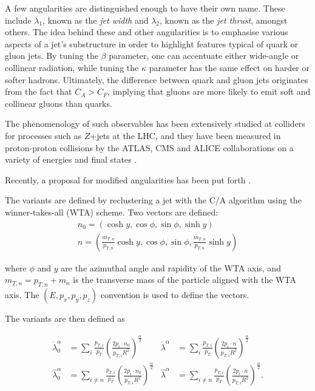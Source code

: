 \documentclass[10pt,a4paper]{book}
\begin{document}
A few angularities are distinguished enough to have their own name. These include $\lambda_1$, known as the \emph{jet width} and $\lambda_2$, known as the \emph{jet thrust}, amongst others. The idea behind these and other angularities is to emphasise various aspects of a jet's substructure in order to highlight features typical of quark or gluon jets. By tuning the $\beta$ parameter, one can accentuate either wide-angle or collinear radiation, while tuning the $\kappa$ parameter has the same effect on harder or softer hadrons. Ultimately, the difference between quark and gluon jets originates from the fact that $C_A > C_F$, implying that gluons are more likely to emit soft and collinear gluons than quarks.

The phenomenology of such observables has been extensively studied at colliders for processes such as $Z$+jets \cite{Reichelt:2021svh} at the LHC, and they have been measured in proton-proton collisions by the ATLAS, CMS and ALICE collaborations on a variety of energies and final states \cite{ATLAS:2019kwg, CMS:2021vsp, ALICE:2021njq, Dhankher:2024rkv}.

Recently, a proposal for modified angularities has been put forth \cite{Dhani:2024gtx}. 

The variants are defined by reclustering a jet with the C/A algorithm using the winner-takes-all (WTA) scheme. Two vectors are defined:
\begin{gather}
n_0 = \left(\cosh y, \cos \phi, \sin \phi, \sinh y \right) \\
n = \left(\frac{m_{T, n}}{p_{T, n}} \cosh y, \cos \phi, \sin \phi, \frac{m_{T, n}}{p_{T, n}}\sinh y \right)
\end{gather}

where $\phi$ and $y$ are the azimuthal angle and rapidity of the WTA axis, and $m_{T, n} = p_{T, n} + m_{n}$ is the transverse mass of the particle aligned with the WTA axis. The $(E, p_x, p_y, p_z)$ convention is used to define the vectors.

The variants are then defined as

\begin{align}
\label{lambdaDot}
\dot{\lambda}_0^\alpha &= \sum_i \frac{p_{T,i}}{p_T}\left(\frac{2p_i\cdot n_0}{p_{T,i}R^2} \right)^{\frac{\alpha}{2}}  & 
\dot{\lambda}^\alpha &= \sum_i \frac{p_{T,i}}{p_T}\left(\frac{2p_i\cdot n}{p_{T,i}R^2} \right)^{\frac{\alpha}{2}} \\
\label{lambdaHat}
\hat{\lambda}_0^\alpha &= \sum_{i\neq n} \frac{p_{T,i}}{p_T}\left(\frac{2p_i\cdot n_0}{p_{T,i}R^2} \right)^{\frac{\alpha}{2}}  &
\hat{\lambda}^\alpha &= \sum_{i\neq n} \frac{p_{T,i}}{p_T}\left(\frac{2p_i\cdot n}{p_{T,i}R^2} \right)^{\frac{\alpha}{2}}.
\end{align}
\end{document}

